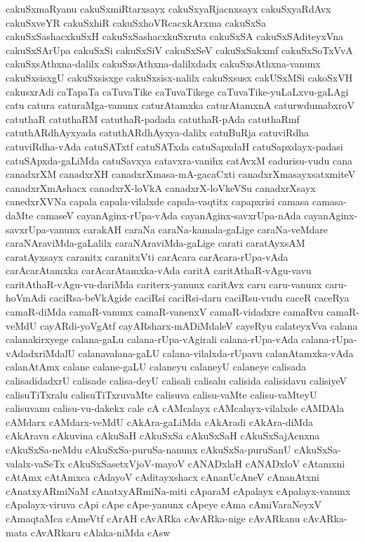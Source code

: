 {cakuSxmaRyanu
cakuSxmiRtarxsayx
cakuSxyaRjacnxsayx
cakuSxyaRdAvx
cakuSxveYR
cakuSxhiR
cakuSxhoVRcacxkArxma
cakuSxSa
cakuSxSashacxkuSxH
cakuSxSashacxkuSxruta
cakuSxSA
cakuSxSAditeyxVna
cakuSxSArUpa
cakuSxSi
cakuSxSiV
cakuSxSeV
cakuSxSakxmf
cakuSxSoTxVvA
cakuSxsAthxna-dalilx
cakuSxsAthxna-dalilxdadx
cakuSxsAthxna-vanunx
cakuSxsisxgU
cakuSxsisxge
cakuSxsisx-nalilx
cakuSxsusx
cakUSxMSi
cakoSxVH
cakusxrAdi
caTapaTa
caTuvaTike
caTuvaTikege
caTuvaTike-yuLaLxvu-gaLAgi
catu
catura
caturaMga-vanunx
caturAtamxka
caturAtamxnA
caturwdumabxroV
catuthaR
catuthaRM
catuthaR-padada
catuthaR-pAda
catuthaRmf
catuthARdhAyxyada
catuthARdhAyxya-dalilx
catuBuRja
catuviRdha
catuviRdha-vAda
catuSATxtf
catuSATxda
catuSapxdaH
catuSapxdayx-padasi
catuSApxda-gaLiMda
catuSavxya
catavxra-vanihx
catAvxM
cadurisu-vudu
cana
canadxrXM
canadxrXH
canadxrXmasa-mA-gacaCxti
canadxrXmasayxsatxmiteV
canadxrXmAshacx
canadxrX-loVkA
canadxrX-loVkeVSu
canadxrXsayx
canedxrXVNa
capala
capala-vilalxde
capala-vaqtitx
capapxrisi
camasa
camasa-daMte
camaseV
cayanAginx-rUpa-vAda
cayanAginx-savxrUpa-nAda
cayanAginx-savxrUpa-vanunx
carakAH
caraNa
caraNa-kamala-gaLige
caraNa-veMdare
caraNAraviMda-gaLalilx
caraNAraviMda-gaLige
carati
caratAyxsAM
caratAyxsayx
caranitx
caranitxVti
carAcara
carAcara-rUpa-vAda
carAcarAtamxka
carAcarAtamxka-vAda
caritA
caritAthaR-vAgu-vavu
caritAthaR-vAgu-vu-dariMda
cariterx-yanunx
caritAvx
caru
caru-vanunx
caru-hoVmAdi
caciRsa-beVkAgide
caciRsi
caciRsi-daru
caciRsu-vudu
caceR
caceRya
camaR-diMda
camaR-vanunx
camaR-vanenxV
camaR-vidadxre
camaRvu
camaR-veMdU
cayARdi-yoVgAtf
cayARsharx-mADiMdaleV
cayeRyu
calateyxVva
calana
calanakirxyege
calana-gaLu
calana-rUpa-vAgirali
calana-rUpa-vAda
calana-rUpa-vAdadxriMdalU
calanavalana-gaLU
calana-vilalxda-rUpavu
calanAtamxka-vAda
calanAtAmx
calane
calane-gaLU
calaneyu
calaneyU
calaneye
calisada
calisadidadxrU
calisade
calisa-deyU
calisali
calisalu
calisida
calisidavu
calisiyeV
calisuTiTxralu
calisuTiTxruvaMte
calisuva
calisu-vaMte
calisu-vaMteyU
calisuvanu
calisu-vu-dakekx
cale
cA
cAMcalayx
cAMcalayx-vilalxde
cAMDAla
cAMdarx
cAMdarx-veMdU
cAkAra-gaLiMda
cAkAradi
cAkAra-diMda
cAkAravu
cAkuvina
cAkuSaH
cAkuSxSa
cAkuSxSaH
cAkuSxSajAcnxna
cAkuSxSa-neMdu
cAkuSxSa-puruSa-nanunx
cAkuSxSa-puruSanU
cAkuSxSa-valalx-vaSeTx
cAkuSxSasetxVjoV-mayoV
cANADxlaH
cANADxloV
cAtamxni
cAtAmx
cAtAmxca
cAdayoV
cAditayxshacx
cAnanUcAneV
cAnanAtxni
cAnatxyARmiNaM
cAnatxyARmiNa-miti
cAparaM
cApalayx
cApalayx-vanunx
cApalayx-viruva
cApi
cApe
cApe-yanunx
cApeye
cAma
cAmiVaraNeyxV
cAmaqtaMca
cAmeVtf
cArAH
cAvARka
cAvARka-nige
cAvARkanu
cAvARka-mata
cAvARkaru
cAlaka-niMda
cAsw
}
